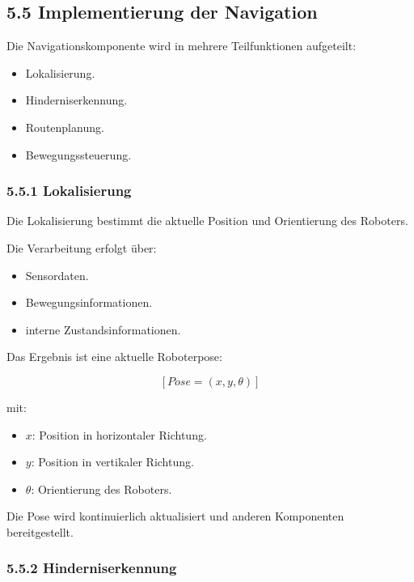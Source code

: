 \documentclass[
  a4paper,
  12pt,
  DIV=12,        %
  parskip=half,  %
  headings=small %
]{scrartcl}
\theoremstyle{definition}
\providecommand{\tightlist}{%
  \setlength{\itemsep}{0pt}\setlength{\parskip}{0pt}}
\theoremstyle{definition}
\providecommand{\tightlist}{%
  \setlength{\itemsep}{0pt}\setlength{\parskip}{0pt}}
\begin{document}
\subsection{5.5 Implementierung der
Navigation}\label{implementierung-der-navigation}

Die Navigationskomponente wird in mehrere Teilfunktionen aufgeteilt:

\begin{itemize}
\tightlist
\item
  Lokalisierung.
\item
  Hinderniserkennung.
\item
  Routenplanung.
\item
  Bewegungssteuerung.
\end{itemize}

\subsubsection{5.5.1 Lokalisierung}\label{lokalisierung}

Die Lokalisierung bestimmt die aktuelle Position und Orientierung des
Roboters.

Die Verarbeitung erfolgt über:

\begin{itemize}
\tightlist
\item
  Sensordaten.
\item
  Bewegungsinformationen.
\item
  interne Zustandsinformationen.
\end{itemize}

Das Ergebnis ist eine aktuelle Roboterpose:

\[
  [ Pose = (x, y, \theta) ]
\]

mit:

\begin{itemize}
\tightlist
\item
  \(x\): Position in horizontaler Richtung.
\item
  \(y\): Position in vertikaler Richtung.
\item
  \(\theta\): Orientierung des Roboters.
\end{itemize}

Die Pose wird kontinuierlich aktualisiert und anderen Komponenten
bereitgestellt.

\subsubsection{5.5.2 Hinderniserkennung}\label{hinderniserkennung-1}
\end{document}
